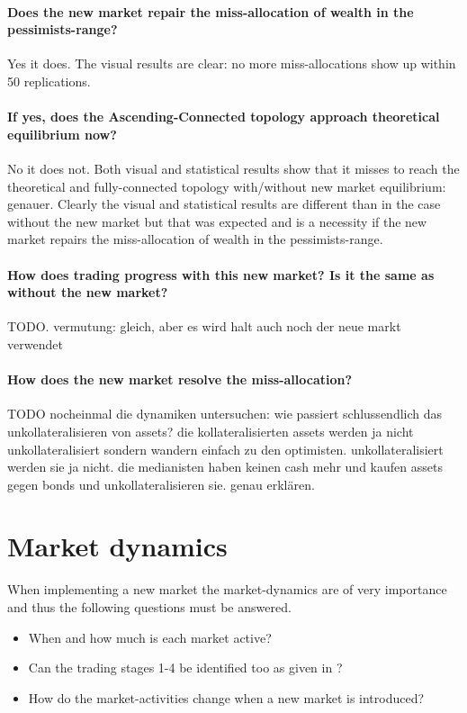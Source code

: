 \documentclass[Bachelorarbeit.tex]{subfiles}
\begin{document}
\paragraph{Does the new market repair the miss-allocation of wealth in the pessimists-range?}
Yes it does. The visual results are clear: no more miss-allocations show up within 50 replications.

\paragraph{If yes, does the Ascending-Connected topology approach theoretical equilibrium now?}
No it does not. Both visual and statistical results show that it misses to reach the theoretical and fully-connected topology with/without new market equilibrium: genauer.
Clearly the visual and statistical results are different than in the case without the new market but that was expected and is a necessity if the new market repairs the miss-allocation of wealth in the pessimists-range.

\paragraph{How does trading progress with this new market? Is it the same as without the new market?}
TODO. vermutung: gleich, aber es wird halt auch noch der neue markt verwendet

\paragraph{How does the new market resolve the miss-allocation?}
TODO nocheinmal die dynamiken untersuchen: wie passiert schlussendlich das unkollateralisieren von assets? die kollateralisierten assets werden ja nicht unkollateralisiert sondern wandern einfach zu den optimisten. unkollateralisiert werden sie ja nicht. die medianisten haben keinen cash mehr und kaufen assets gegen bonds und unkollateralisieren sie. genau erklären.


\section{Market dynamics}
When implementing a new market the market-dynamics are of very importance and thus the following questions must be answered.

\begin{itemize}
\item When and how much is each market active? 
\item Can the trading stages 1-4 be identified too as given in \cite{Breuer_2015}?
\item How do the market-activities change when a new market is introduced?
\end{itemize}
\end{document}
